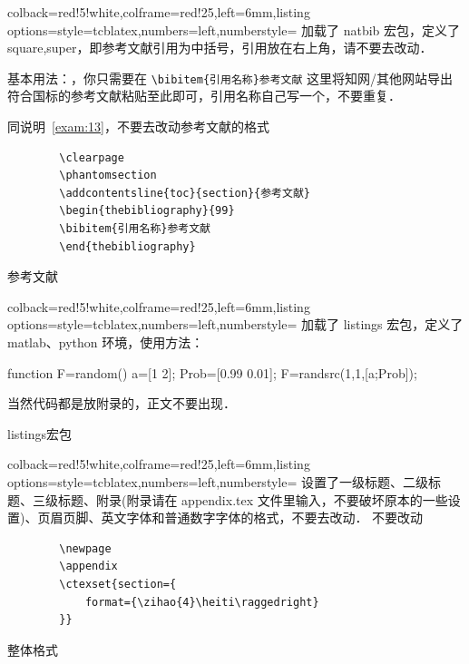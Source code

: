 \documentclass{JXUSTmodeling}
\begin{document}
\begin{example}[htbp]
    \centering
    \begin{tcblisting}{colback=red!5!white,colframe=red!25,left=6mm,listing options={style=tcblatex,numbers=left,numberstyle=\tiny\color{red!75!black}}}
    加载了 natbib 宏包，定义了 square,super，即参考文献引用为中括号，引用放在右上角，请不要去改动．

    基本用法：\cite{引用名称}，你只需要在 \verb|\bibitem{引用名称}参考文献| 这里将知网/其他网站导出符合国标的参考文献粘贴至此即可，引用名称自己写一个，不要重复．

    同说明~\ref{exam:13}，不要去改动参考文献的格式
    \begin{verbatim}
        \clearpage
        \phantomsection
        \addcontentsline{toc}{section}{参考文献}
        \begin{thebibliography}{99}
        \bibitem{引用名称}参考文献
        \end{thebibliography}
    \end{verbatim}
\end{tcblisting}
    \caption{参考文献}\label{exam:11}
\end{example}

\begin{example}[htbp]
    \centering
    \begin{tcblisting}{colback=red!5!white,colframe=red!25,left=6mm,listing options={style=tcblatex,numbers=left,numberstyle=\tiny\color{red!75!black}}}
    加载了 listings 宏包，定义了 matlab、python 环境，使用方法：
    \begin{matlab}
function F=random()
a=[1 2];
Prob=[0.99 0.01];
F=randsrc(1,1,[a;Prob]);

    \end{matlab}
当然代码都是放附录的，正文不要出现．
\end{tcblisting}
    \caption{listings宏包}\label{exam:12}
\end{example}

\begin{example}[htbp]
    \centering
    \begin{tcblisting}{colback=red!5!white,colframe=red!25,left=6mm,listing options={style=tcblatex,numbers=left,numberstyle=\tiny\color{red!75!black}}}
    设置了一级标题、二级标题、三级标题、附录(附录请在 appendix.tex 文件里输入，不要破坏原本的一些设置)、页眉页脚、英文字体和普通数字字体的格式，不要去改动．
    不要改动
    \begin{verbatim}
        \newpage
        \appendix
        \ctexset{section={
            format={\zihao{4}\heiti\raggedright}
        }}
    \end{verbatim}
\end{tcblisting}
    \caption{整体格式}\label{exam:13}
\end{example}

    
    
\end{document}
